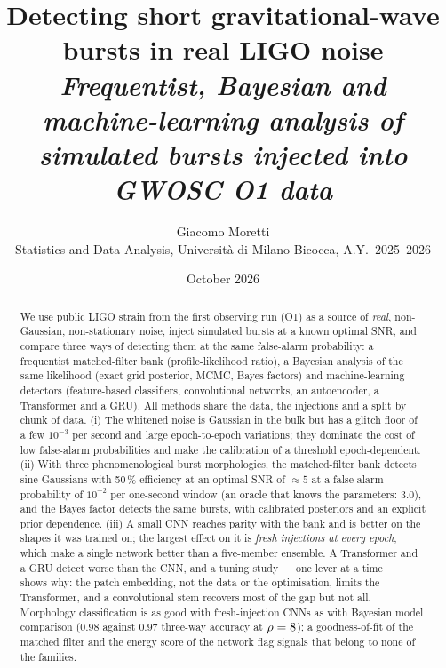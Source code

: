 \title{\textbf{Detecting short gravitational-wave bursts in real LIGO noise}\\[0.6em]
\large\itshape Frequentist, Bayesian and machine-learning analysis of simulated bursts injected into GWOSC O1 data}
\author{Giacomo Moretti\\[0.2em]\small Statistics and Data Analysis, Università di Milano-Bicocca, A.Y.\ 2025--2026}
\date{October 2026}
\maketitle

\begin{abstract}
\noindent We use public LIGO strain from the first observing run (O1) as a source of \emph{real}, non-Gaussian, non-stationary noise, inject simulated bursts at a known optimal SNR, and compare three ways of detecting them at the same false-alarm probability: a frequentist matched-filter bank (profile-likelihood ratio), a Bayesian analysis of the same likelihood (exact grid posterior, MCMC, Bayes factors) and machine-learning detectors (feature-based classifiers, convolutional networks, an autoencoder, a Transformer and a GRU). All methods share the data, the injections and a split by chunk of data.
(i) The whitened noise is Gaussian in the bulk but has a glitch floor of a few $10^{-3}$ per second and large epoch-to-epoch variations; they dominate the cost of low false-alarm probabilities and make the calibration of a threshold epoch-dependent.
(ii) With three phenomenological burst morphologies, the matched-filter bank detects sine-Gaussians with 50\,\% efficiency at an optimal SNR of $\approx5$ at a false-alarm probability of $10^{-2}$ per one-second window (an oracle that knows the parameters: $3.0$), and the Bayes factor detects the same bursts, with calibrated posteriors and an explicit prior dependence.
(iii) A small CNN reaches parity with the bank and is better on the shapes it was trained on; the largest effect on it is \emph{fresh injections at every epoch}, which make a single network better than a five-member ensemble. A Transformer and a GRU detect worse than the CNN, and a tuning study --- one lever at a time --- shows why: the patch embedding, not the data or the optimisation, limits the Transformer, and a convolutional stem recovers most of the gap but not all. Morphology classification is as good with fresh-injection CNNs as with Bayesian model comparison ($0.98$ against $0.97$ three-way accuracy at $\rho=8$); a goodness-of-fit of the matched filter and the energy score of the network flag signals that belong to none of the families.

\end{abstract}
